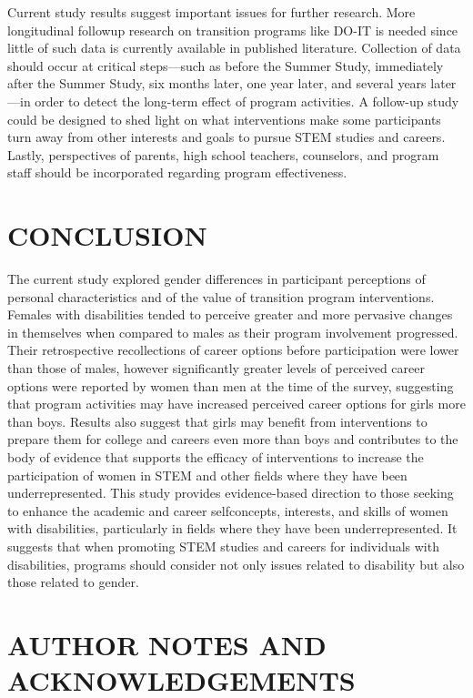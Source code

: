 \documentclass[11.5pt]{sig-alternate} %
\begin{document}
\begin{large}
Current study results suggest important issues for further research. More longitudinal followup research on transition programs like DO-IT is needed since little of such data is currently available in published literature. Collection of data should occur at critical steps—such as before the Summer Study, immediately after the Summer Study, six months later, one year later, and several years later—in order to detect the long-term effect of program activities. A follow-up study could be designed to shed light on what interventions make some participants turn away from other interests and goals to pursue STEM studies and careers. Lastly, perspectives of parents, high school teachers, counselors, and program staff should be incorporated regarding program effectiveness.  
 
\section*{CONCLUSION }
 
The current study explored gender differences in participant perceptions of personal characteristics and of the value of transition program interventions. Females with disabilities tended to perceive greater and more pervasive changes in themselves when compared to males as their program involvement progressed. Their retrospective recollections of career options before participation were lower than those of males, however significantly greater levels of perceived career options were reported by women than men at the time of the survey, suggesting that program activities may have increased perceived career options for girls more than boys. Results also suggest that girls may benefit from interventions to prepare them for college and careers even more than boys and contributes to the body of evidence that supports the efficacy of interventions to increase the participation of women in STEM and other fields where they have been underrepresented. This study provides evidence-based direction to those seeking to enhance the academic and career selfconcepts, interests, and skills of women with disabilities, particularly in fields where they have been underrepresented. It suggests that when promoting STEM studies and careers for individuals with disabilities, programs should consider not only issues related to disability but also those related to gender.  
 
\section*{AUTHOR NOTES AND ACKNOWLEDGEMENTS}
 

\end{large}
\end{document}
